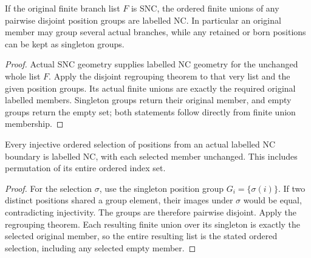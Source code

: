 \begin{corollary}
\label{hir:actual-snc-branches-supply-labelled-nc-groups}
\leanok
If the original finite branch list $F$ is SNC, the ordered finite unions
of any pairwise disjoint position groups are labelled NC. In
particular an original member may group several actual branches,
while any retained or born positions can be kept as singleton groups.
\end{corollary}
\begin{proof}
Actual SNC geometry supplies labelled NC geometry for the unchanged
whole list $F$. Apply the disjoint regrouping theorem to that very
list and the given position groups. Its actual finite unions are
exactly the required original labelled members. Singleton groups
return their original member, and empty groups return the empty set;
both statements follow directly from finite union membership.
\end{proof}

\begin{corollary}
\label{hir:labelled-nc-injective-original-position-selection}
\leanok
Every injective ordered selection of positions from an actual labelled
NC boundary is labelled NC, with each selected member unchanged.
This includes permutation of its entire ordered index set.
\end{corollary}
\begin{proof}
For the selection $\sigma$, use the singleton position group
$G_i=\{\sigma(i)\}$. If two distinct positions shared a group element,
their images under $\sigma$ would be equal, contradicting
injectivity. The groups are therefore pairwise disjoint. Apply the
regrouping theorem. Each resulting finite union over its singleton is
exactly the selected original member, so the entire resulting list
is the stated ordered selection, including any selected empty member.
\end{proof}
